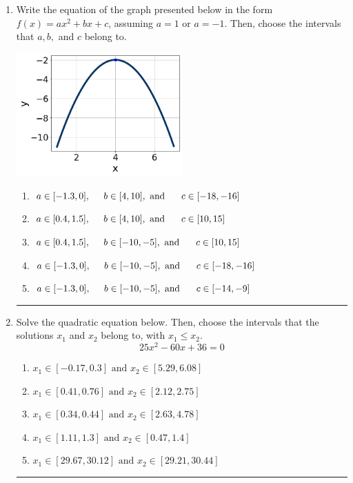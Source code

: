 \documentclass[14pt]{extbook}
\newcommand{\litem}[1]{\item#1\hspace*{-1cm}\rule{\textwidth}{0.4pt}}
\begin{document}
\begin{enumerate}
\litem{
Write the equation of the graph presented below in the form $f(x)=ax^2+bx+c$, assuming  $a=1$ or $a=-1$. Then, choose the intervals that $a, b,$ and $c$ belong to.
\begin{center}
    \includegraphics[width=0.5\textwidth]{../Figures/quadraticGraphToEquationA.png}
\end{center}
\begin{enumerate}[label=\Alph*.]
\item \( a \in [-1.3, 0], \hspace*{5mm} b \in [4, 10], \text{ and } \hspace*{5mm} c \in [-18, -16] \)
\item \( a \in [0.4, 1.5], \hspace*{5mm} b \in [4, 10], \text{ and } \hspace*{5mm} c \in [10, 15] \)
\item \( a \in [0.4, 1.5], \hspace*{5mm} b \in [-10, -5], \text{ and } \hspace*{5mm} c \in [10, 15] \)
\item \( a \in [-1.3, 0], \hspace*{5mm} b \in [-10, -5], \text{ and } \hspace*{5mm} c \in [-18, -16] \)
\item \( a \in [-1.3, 0], \hspace*{5mm} b \in [-10, -5], \text{ and } \hspace*{5mm} c \in [-14, -9] \)

\end{enumerate} }
\litem{
Solve the quadratic equation below. Then, choose the intervals that the solutions $x_1$ and $x_2$ belong to, with $x_1 \leq x_2$.\[ 25x^{2} -60 x + 36 = 0 \]\begin{enumerate}[label=\Alph*.]
\item \( x_1 \in [-0.17, 0.3] \text{ and } x_2 \in [5.29, 6.08] \)
\item \( x_1 \in [0.41, 0.76] \text{ and } x_2 \in [2.12, 2.75] \)
\item \( x_1 \in [0.34, 0.44] \text{ and } x_2 \in [2.63, 4.78] \)
\item \( x_1 \in [1.11, 1.3] \text{ and } x_2 \in [0.47, 1.4] \)
\item \( x_1 \in [29.67, 30.12] \text{ and } x_2 \in [29.21, 30.44] \)


\end{enumerate}}
\end{enumerate}
\end{document}
